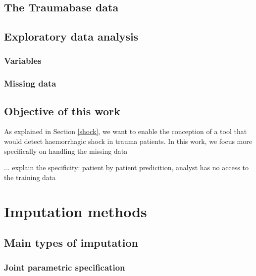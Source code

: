 \documentclass[12pt, a4paper]{memoir}
\begin{document}
	\section{The Traumabase data}
	\section{Exploratory data analysis}
		\subsection{Variables}
		\subsection{Missing data}
	\section{Objective of this work}
As explained in Section \ref{shock}, we want to enable the conception of a tool that would detect haemorrhagic shock in trauma patients. In this work, we focus more specifically on handling the missing data

... explain the specificity: patient by patient predicition, analyst has no access to the training data


\chapter{Imputation methods}
\label{imputation}
	\section{Main types of imputation}
		\subsection{Joint parametric specification}
\end{document}
